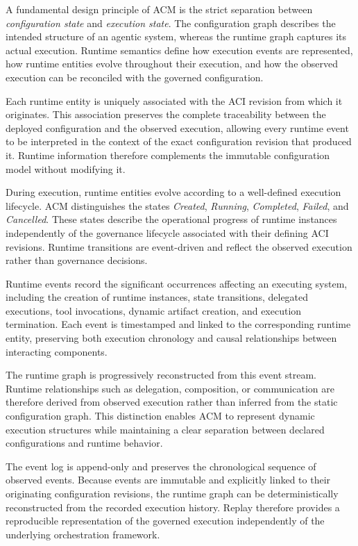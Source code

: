 \documentclass[10pt]{article}
\begin{document}
A fundamental design principle of ACM is the strict separation between
\emph{configuration state} and \emph{execution state}. The configuration graph describes the intended structure of an agentic system, whereas the runtime graph captures its actual execution. Runtime semantics define how execution events are represented, how runtime entities evolve throughout their execution, and how the observed execution can be reconciled with the governed configuration.

Each runtime entity is uniquely associated with the ACI revision from which it originates. This association preserves the complete traceability between the deployed configuration and the observed execution, allowing every runtime event to be interpreted in the context of the exact configuration revision that produced it. Runtime information therefore complements the immutable configuration model without modifying it.

During execution, runtime entities evolve according to a well-defined execution lifecycle. ACM distinguishes the states \textit{Created}, \textit{Running}, \textit{Completed}, \textit{Failed}, and \textit{Cancelled}. These states describe the operational progress of runtime instances independently of the governance lifecycle associated with their defining ACI revisions. Runtime transitions are event-driven and reflect the observed execution rather than governance decisions.

Runtime events record the significant occurrences affecting an executing system, including the creation of runtime instances, state transitions, delegated executions, tool invocations, dynamic artifact creation, and execution termination. Each event is timestamped and linked to the corresponding runtime entity, preserving both execution chronology and causal relationships between interacting components.

The runtime graph is progressively reconstructed from this event stream. Runtime relationships such as delegation, composition, or communication are therefore derived from observed execution rather than inferred from the static configuration graph. This distinction enables ACM to represent dynamic execution structures while maintaining a clear separation between declared configurations and runtime behavior.

The event log is append-only and preserves the chronological sequence of observed events. Because events are immutable and explicitly linked to their originating configuration revisions, the runtime graph can be deterministically reconstructed from the recorded execution history. Replay therefore provides a reproducible representation of the governed execution independently of the underlying orchestration framework.
\end{document}
